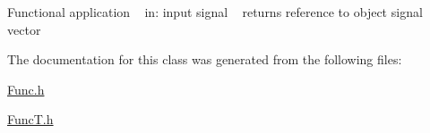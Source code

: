 Functional application ~\newline
in\+: input signal ~\newline
returns reference to object signal vector 

The documentation for this class was generated from the following files\+:\begin{DoxyCompactItemize}
\item 
\hyperlink{_func_8h}{Func.\+h}\item 
\hyperlink{_func_t_8h}{Func\+T.\+h}\end{DoxyCompactItemize}
